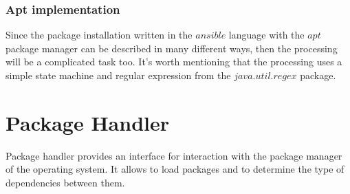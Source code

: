 \subsubsection*{Apt implementation}
Since the package installation written in the $ansible$ language with the $apt$ package manager can be described in many different ways, then the processing will be a complicated task too.
It's worth mentioning that the processing uses a simple state machine and regular expression from the $java$.$util$.$regex$ package.

\section{Package Handler}
Package handler provides an interface for interaction with the package manager of the operating system.
It allows to load packages and to determine the type of dependencies between them.

